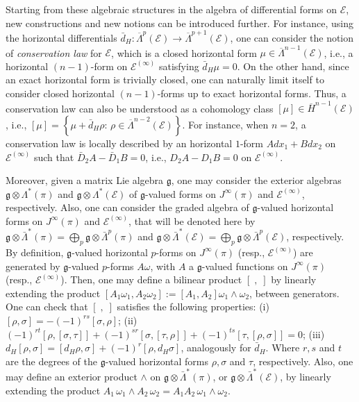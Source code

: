\documentclass[12pt,english]{elsarticle}
\theoremstyle{plain}
\theoremstyle{plain}
\theoremstyle{remark}
\theoremstyle{plain}
\theoremstyle{definition}
\theoremstyle{definition}
\begin{document}
Starting from these algebraic structures in the algebra of differential
forms on $\mathcal{E}$, new constructions and new notions can be introduced
further. For instance, using the horizontal differentials
$\bar{d}_{H}:\overline{\Lambda}^{p}(\mathcal{E})\rightarrow
\overline{\Lambda}^{p+1}(\mathcal{E})$, one can consider the notion of
\textit{conservation law} for $\mathcal{E}$, which is a closed horizontal
form $\mu \in \overline{\Lambda}^{n-1}(\mathcal{E})$, i.e., a horizontal
$(n-1)$-form on $\mathcal{E}^{(\infty )}$ satisfying
$\bar{d}_{H}\mu =0$. On the other hand, since an exact horizontal form
is trivially closed, one can naturally limit itself to consider closed
horizontal $(n-1)$-forms up to exact horizontal forms. Thus, a conservation
law can also be understood as a cohomology class
$[\mu ]\in \overline{H}^{n-1}(\mathcal{E})$, i.e.,
$[\mu ]=\left \{ \mu +\bar{d}_{H}\rho :\,\rho \in \overline{\Lambda}^{n-2}(
\mathcal{E})\right \} $. For instance, when $n=2$, a conservation law is
locally described by an horizontal $1$-form $Adx_{1}+Bdx_{2}$ on
$\mathcal{E}^{(\infty )}$ such that $\bar{D}_{2}A-\bar{D}_{1}B=0$, i.e.,
$D_{2}A-D_{1}B=0$ on $\mathcal{E}^{(\infty )}$.

Moreover, given a matrix Lie algebra $\mathfrak{g}$, one may consider the
exterior algebras $\mathfrak{g}\otimes \Lambda ^{*}(\pi )$ and
$\mathfrak{g}\otimes \Lambda ^{*}(\mathcal{E})$ of $\mathfrak{g}$-valued
forms on $J^{\infty}(\pi )$ and $\mathcal{E}^{(\infty )}$, respectively.
Also, one can consider the graded algebra of $\mathfrak{g}$-valued horizontal
forms on $J^{\infty}(\pi )$ and $\mathcal{E}^{(\infty )}$, that will be
denoted here by
$\mathfrak{g}\otimes \bar{\Lambda}^{*}\left (\pi \right )=\bigoplus _{p}
\mathfrak{g}\otimes \bar{\Lambda}^{p}(\pi )$ and
$\mathfrak{g}\otimes \bar{\Lambda}^{*}\left ({\mathcal{E}}\right )=
\bigoplus _{p}\mathfrak{g}\otimes \bar{\Lambda}^{p}\left ({\mathcal{E}}
\right )$, respectively. By definition, $\mathfrak{g}$-valued horizontal
$p$-forms on $J^{\infty}(\pi )$ (resp., $\mathcal{E}^{(\infty )}$) are
generated by $\mathfrak{g}$-valued $p$-forms $A\omega $, with $A$ a
$\mathfrak{g}$-valued functions on $J^{\infty}(\pi )$ (resp.,
$\mathcal{E}^{(\infty )}$). Then, one may define a bilinear product
$[\;,\;]$ by linearly extending the product
$\left [A_{1}\omega _{1},A_{2}\omega _{2}\right ]:=\left [A_{1},A_{2}
\right ]\omega _{1}\wedge \omega _{2}$, between generators. One can check
that $[\;,\;]$ satisfies the following properties: (i)
$[\rho ,\sigma ]=-(-1)^{rs}[\sigma ,\rho ]$; (ii)
$(-1)^{rt}[\rho ,[\sigma ,\tau ]]+(-1)^{sr}[\sigma ,[\tau ,\rho ]]+(-1)^{ts}[
\tau ,[\rho ,\sigma ]]=0$; (iii)
$d_{H}[\rho ,\sigma ]=[d_{H}\rho ,\sigma ]+(-1)^{r}[\rho ,d_{H}
\sigma ]$, analogously for $\bar{d}_{H}$. Where $r,s$ and $t$ are the degrees
of the $\mathfrak{g}$-valued horizontal forms $\rho ,\sigma $ and
$\tau $, respectively. Also, one may define an exterior product
$\wedge $ on
$\mathfrak{g}\otimes \bar{\Lambda}^{*}\left (\pi \right )$, or
$\mathfrak{g}\otimes \bar{\Lambda}^{*}\left (\mathcal{E}\right )$, by linearly
extending the product
$A_{1}\,\omega _{1}\wedge A_{2}\,\omega _{2}=A_{1}A_{2}\,\omega _{1}
\wedge \omega _{2}$.
\end{document}
